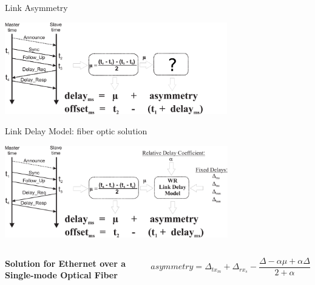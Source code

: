 \documentclass[compress,red]{beamer}
\begin{document}
\begin{frame}{Link Asymmetry}

  \begin{center}
  \includegraphics[height=4cm]{protocol/wrLinkModel_init.pdf}
  \end{center}

\end{frame}
\begin{frame}{Link Delay Model: fiber optic solution}

  \begin{center}
  \includegraphics[height=4cm]{protocol/wrLinkModel.pdf}
  \end{center}

  \begin{columns}[c]
  \column{1.5in}

    \begin{center}
      \textbf{Solution for Ethernet over a Single-mode Optical Fiber}
    \end{center}    

  \column{2.7in}

    \begin{equation}
      \nonumber asymmetry = \Delta_{tx_m} + \Delta_{rx_s} - \frac{\Delta - \alpha \mu + \alpha \Delta}{2 + \alpha}
    \end{equation}

  \end{columns}

\end{frame}
\end{document}
